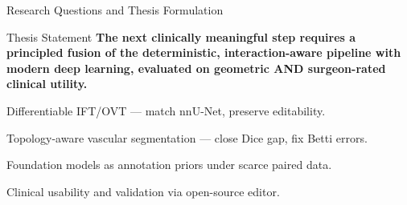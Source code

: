 \documentclass[aspectratio=169,11pt,xcolor=table]{beamer}
\begin{document}
\begin{frame}{Research Questions and Thesis Formulation}
\centering
{}

\vspace{0.2cm}
\begin{alertblock}{Thesis Statement}
  \centering\scriptsize\bfseries
  The next clinically meaningful step requires a principled fusion of the deterministic, interaction-aware pipeline with modern deep learning, evaluated on geometric AND surgeon-rated clinical utility.
\end{alertblock}
\vspace{0.1cm}
\scriptsize
\begin{description}[leftmargin=1.0em,style=nextline]
\setlength\itemsep{1pt}
\item[RQ1] Differentiable IFT/OVT --- match nnU-Net, preserve editability.
\item[RQ2] Topology-aware vascular segmentation --- close Dice gap, fix Betti errors.
\item[RQ3] Foundation models as annotation priors under scarce paired data.
\item[RQ4] Clinical usability and validation via open-source editor.
\end{description}
\end{frame}
\end{document}
